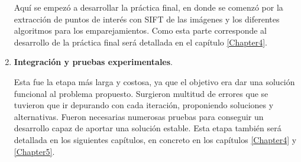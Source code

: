 \begin{enumerate}
Aquí se empezó a desarrollar la práctica final, en donde se comenzó por la extracción de puntos de interés con SIFT de las imágenes y los diferentes algoritmos para los emparejamientos. Como esta parte corresponde al desarrollo de la práctica final será detallada en el capítulo \ref{Chapter4}.

\item \textbf{Integración y pruebas experimentales}.

Esta fue la etapa más larga y costosa, ya que el objetivo era dar una solución funcional al problema propuesto. Surgieron multitud de errores que se tuvieron que ir depurando con cada iteración, proponiendo soluciones y alternativas. Fueron necesarias numerosas pruebas para conseguir un desarrollo capaz de aportar una solución estable. Esta etapa también será detallada en los siguientes capítulos, en concreto en los capítulos \ref{Chapter4} y \ref{Chapter5}.

\end{enumerate}
